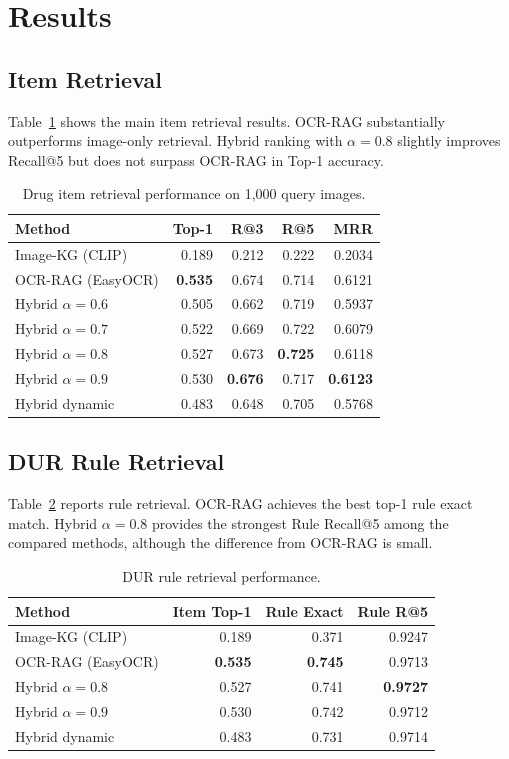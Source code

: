 \documentclass[sigconf,screen,nonacm]{acmart}
\begin{document}
\section{Results}
\subsection{Item Retrieval}
Table~\ref{tab:item-results} shows the main item retrieval results. OCR-RAG substantially outperforms image-only retrieval. Hybrid ranking with $\alpha=0.8$ slightly improves Recall@5 but does not surpass OCR-RAG in Top-1 accuracy.

\begin{table}[t]
\centering
\caption{Drug item retrieval performance on 1,000 query images.}
\label{tab:item-results}
\begin{tabular}{lrrrr}
\toprule
Method & Top-1 & R@3 & R@5 & MRR \\
\midrule
Image-KG (CLIP) & 0.189 & 0.212 & 0.222 & 0.2034 \\
OCR-RAG (EasyOCR) & \textbf{0.535} & 0.674 & 0.714 & 0.6121 \\
Hybrid $\alpha=0.6$ & 0.505 & 0.662 & 0.719 & 0.5937 \\
Hybrid $\alpha=0.7$ & 0.522 & 0.669 & 0.722 & 0.6079 \\
Hybrid $\alpha=0.8$ & 0.527 & 0.673 & \textbf{0.725} & 0.6118 \\
Hybrid $\alpha=0.9$ & 0.530 & \textbf{0.676} & 0.717 & \textbf{0.6123} \\
Hybrid dynamic & 0.483 & 0.648 & 0.705 & 0.5768 \\
\bottomrule
\end{tabular}
\end{table}

\subsection{DUR Rule Retrieval}
Table~\ref{tab:dur-results} reports rule retrieval. OCR-RAG achieves the best top-1 rule exact match. Hybrid $\alpha=0.8$ provides the strongest Rule Recall@5 among the compared methods, although the difference from OCR-RAG is small.

\begin{table}[t]
\centering
\caption{DUR rule retrieval performance.}
\label{tab:dur-results}
\begin{tabular}{lrrr}
\toprule
Method & Item Top-1 & Rule Exact & Rule R@5 \\
\midrule
Image-KG (CLIP) & 0.189 & 0.371 & 0.9247 \\
OCR-RAG (EasyOCR) & \textbf{0.535} & \textbf{0.745} & 0.9713 \\
Hybrid $\alpha=0.8$ & 0.527 & 0.741 & \textbf{0.9727} \\
Hybrid $\alpha=0.9$ & 0.530 & 0.742 & 0.9712 \\
Hybrid dynamic & 0.483 & 0.731 & 0.9714 \\
\bottomrule
\end{tabular}
\end{table}
\end{document}

